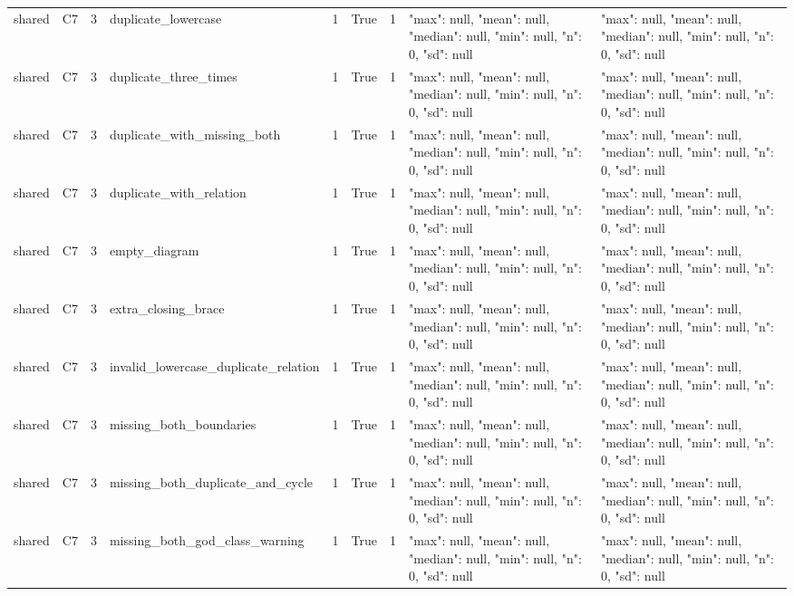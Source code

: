 \begin{tabular}{lllllllll}
shared & C7 & 3 & duplicate\_lowercase & 1 & True & 1 & {"max": null, "mean": null, "median": null, "min": null, "n": 0, "sd": null} & {"max": null, "mean": null, "median": null, "min": null, "n": 0, "sd": null} \\
shared & C7 & 3 & duplicate\_three\_times & 1 & True & 1 & {"max": null, "mean": null, "median": null, "min": null, "n": 0, "sd": null} & {"max": null, "mean": null, "median": null, "min": null, "n": 0, "sd": null} \\
shared & C7 & 3 & duplicate\_with\_missing\_both & 1 & True & 1 & {"max": null, "mean": null, "median": null, "min": null, "n": 0, "sd": null} & {"max": null, "mean": null, "median": null, "min": null, "n": 0, "sd": null} \\
shared & C7 & 3 & duplicate\_with\_relation & 1 & True & 1 & {"max": null, "mean": null, "median": null, "min": null, "n": 0, "sd": null} & {"max": null, "mean": null, "median": null, "min": null, "n": 0, "sd": null} \\
shared & C7 & 3 & empty\_diagram & 1 & True & 1 & {"max": null, "mean": null, "median": null, "min": null, "n": 0, "sd": null} & {"max": null, "mean": null, "median": null, "min": null, "n": 0, "sd": null} \\
shared & C7 & 3 & extra\_closing\_brace & 1 & True & 1 & {"max": null, "mean": null, "median": null, "min": null, "n": 0, "sd": null} & {"max": null, "mean": null, "median": null, "min": null, "n": 0, "sd": null} \\
shared & C7 & 3 & invalid\_lowercase\_duplicate\_relation & 1 & True & 1 & {"max": null, "mean": null, "median": null, "min": null, "n": 0, "sd": null} & {"max": null, "mean": null, "median": null, "min": null, "n": 0, "sd": null} \\
shared & C7 & 3 & missing\_both\_boundaries & 1 & True & 1 & {"max": null, "mean": null, "median": null, "min": null, "n": 0, "sd": null} & {"max": null, "mean": null, "median": null, "min": null, "n": 0, "sd": null} \\
shared & C7 & 3 & missing\_both\_duplicate\_and\_cycle & 1 & True & 1 & {"max": null, "mean": null, "median": null, "min": null, "n": 0, "sd": null} & {"max": null, "mean": null, "median": null, "min": null, "n": 0, "sd": null} \\
shared & C7 & 3 & missing\_both\_god\_class\_warning & 1 & True & 1 & {"max": null, "mean": null, "median": null, "min": null, "n": 0, "sd": null} & {"max": null, "mean": null, "median": null, "min": null, "n": 0, "sd": null} \\

\end{tabular}
